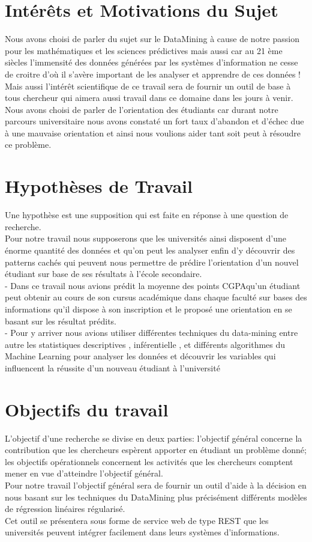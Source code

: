\section{Intérêts et Motivations du Sujet}
Nous avons choisi de parler du sujet sur le DataMining à cause de notre passion pour les mathématiques et les sciences prédictives mais aussi car au 21 ème siècles l'immensité des données générées par les systèmes d'information ne cesse de croitre d'où il s'avère important de les analyser et apprendre de ces données !\\
Mais aussi l'intérêt scientifique de ce travail sera de fournir un outil de base à tous chercheur qui aimera aussi travail dans ce domaine dans les jours à venir. \\
Nous avons choisi de parler de l'orientation des étudiants car durant notre parcours universitaire nous avons constaté un fort taux d'abandon et d'échec due à une mauvaise orientation et ainsi nous voulions aider tant soit peut à résoudre ce problème. 
\section{Hypothèses de Travail}
Une hypothèse est  une supposition qui est faite en réponse à une question de recherche. \cite{MethFr} \\
Pour notre travail nous supposerons que les universités ainsi disposent d'une énorme quantité des données et qu'on peut les analyser enfin d'y découvrir des patterns cachés qui peuvent nous permettre de prédire l'orientation d'un nouvel étudiant sur base de ses résultats à l'école secondaire.  \\
- Dans ce travail nous avions prédit la moyenne des points \ac{CGPA}qu'un étudiant peut obtenir au cours de son cursus académique  dans chaque faculté sur bases des informations qu'il dispose à son inscription et le proposé une orientation en se basant sur les résultat prédits. \\
- Pour y arriver nous avions utiliser différentes techniques du data-mining entre autre les statistiques descriptives , inférentielle , et différents algorithmes du Machine Learning pour analyser les données et découvrir les variables qui influencent la réussite d'un nouveau étudiant à l'université
\section{Objectifs du travail}
L'objectif d’une recherche se divise en deux parties: l'objectif général concerne la contribution que les chercheurs espèrent apporter en étudiant un problème donné; les objectifs opérationnels concernent les activités que les chercheurs comptent mener en vue
d'atteindre l'objectif général. \cite{MethFr} \\
Pour notre travail l'objectif général sera de fournir un outil d'aide à la décision en nous basant sur les techniques du DataMining plus précisément différents modèles de régression linéaires régularisé. \\
Cet outil se présentera sous forme de service web de type \ac{REST} que les universités peuvent intégrer facilement dans leurs systèmes d'informations.

